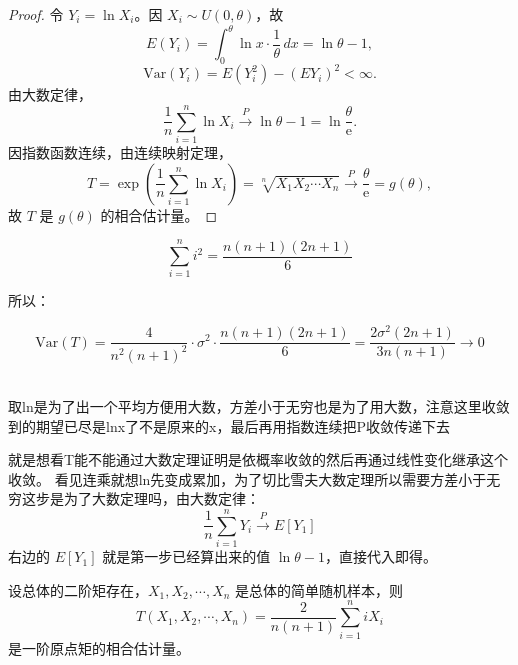 \begin{proof}
令 $Y_i = \ln X_i$。因 $X_i \sim U(0,\theta)$，故
\[
E(Y_i) = \int_0^\theta \ln x \cdot \frac{1}{\theta} \, dx = \ln\theta - 1,
\]
\[
\mathrm{Var}(Y_i) = E(Y_i^2) - (E Y_i)^2 < \infty.
\]
由大数定律，
\[
\frac{1}{n}\sum_{i=1}^n \ln X_i \xrightarrow{P} \ln\theta - 1 = \ln\frac{\theta}{\mathrm{e}}.
\]
因指数函数连续，由连续映射定理，
\[
T = \exp\!\left(\frac{1}{n}\sum_{i=1}^n \ln X_i\right) = \sqrt[n]{X_1 X_2 \cdots X_n} \xrightarrow{P} \frac{\theta}{\mathrm{e}} = g(\theta),
\]
故 $T$ 是 $g(\theta)$ 的相合估计量。
\end{proof}
\begin{dxtips}
    $$\sum_{i=1}^n i^2 = \frac{n(n+1)(2n+1)}{6}$$

所以：

$$\text{Var}(T) = \frac{4}{n^2(n+1)^2} \cdot \sigma^2 \cdot \frac{n(n+1)(2n+1)}{6} = \frac{2\sigma^2(2n+1)}{3n(n+1)} \to 0$$
\end{dxtips}
\begin{dxtips}
    取ln是为了出一个平均方便用大数，方差小于无穷也是为了用大数，注意这里收敛到的期望已尽是lnx了不是原来的x，最后再用指数连续把P收敛传递下去
\end{dxtips}
\begin{dxtips}
就是想看T能不能通过大数定理证明是依概率收敛的然后再通过线性变化继承这个收敛。
    看见连乘就想ln先变成累加，为了切比雪夫大数定理所以需要方差小于无穷这步是为了大数定理吗，由大数定律：
$$\frac{1}{n}\sum_{i=1}^n Y_i \xrightarrow{P} E[Y_1]$$
右边的 $E[Y_1]$ 就是第一步已经算出来的值 $\ln\theta - 1$，直接代入即得。
\end{dxtips}
\begin{homework}[6]
设总体的二阶矩存在，$X_1, X_2, \cdots, X_n$ 是总体的简单随机样本，则
\[
T(X_1, X_2, \cdots, X_n) = \frac{2}{n(n+1)} \sum_{i=1}^n i X_i
\]
是一阶原点矩的相合估计量。
\end{homework}

